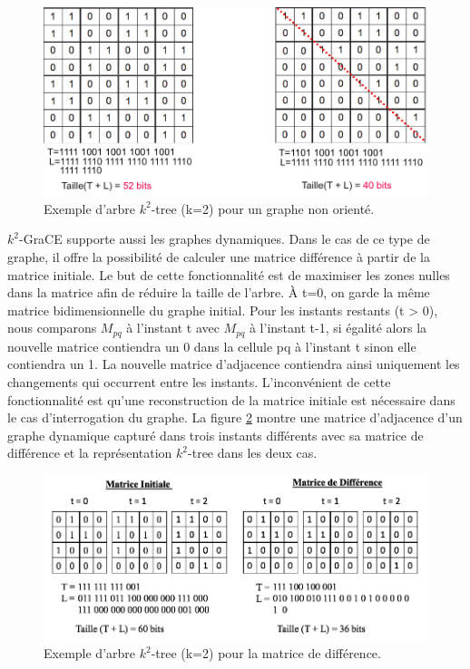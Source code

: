 \documentclass[a4paper,oneside,12pt]{report}
\theoremstyle{definition}
\begin{document}
\begin{figure}[H]
\centering
	\includegraphics[scale=0.4]{./ressources/image/k2_non.jpg}
	\caption[Exemple d'arbre $k^2$-tree (k=2) pour un graphe non orienté.]{Exemple d'arbre $k^2$-tree (k=2) pour un graphe non orienté.}
	\label{k2_non}
\end{figure}	


	
	$k^2$-GraCE supporte aussi les graphes dynamiques. Dans le cas de ce type de graphe, il offre la possibilité de calculer une matrice différence à partir de la matrice initiale. Le but de cette fonctionnalité est de maximiser les zones nulles dans la matrice afin de réduire la taille de l'arbre. À t=0, on garde la même matrice bidimensionnelle du graphe initial. Pour les instants restants (t > 0), nous comparons $M_{pq}$ à l'instant t avec $M_{pq}$ à l'instant t-1, si égalité alors la nouvelle matrice contiendra un 0 dans la cellule pq à l'instant t sinon elle contiendra un 1. La nouvelle matrice d'adjacence contiendra ainsi uniquement les changements qui occurrent entre les instants. L'inconvénient de cette fonctionnalité est qu'une reconstruction de la matrice initiale est nécessaire dans le cas d'interrogation du graphe. La figure \ref{mat_diff} montre une matrice d'adjacence d'un graphe dynamique capturé dans trois instants différents avec sa matrice de différence et la représentation $k^2$-tree dans les deux cas.

\begin{figure}[H]
\centering
	\includegraphics[scale=0.48]{./ressources/image/dynk2diff.png}
	\caption[Exemple d'arbre $k^2$-tree (k=2) pour la matrice de différence]{Exemple d'arbre $k^2$-tree (k=2) pour la matrice de différence.}
	\label{mat_diff}
\end{figure}
\end{document}
